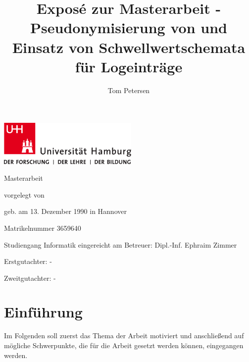 \documentclass[
    fontsize=12pt,
    headings=small,
    parskip=half,           %
    bibliography=totoc,
    numbers=noenddot,       %
    open=any,               %
    ]{scrreprt}
\title{Exposé zur Masterarbeit - Pseudonymisierung von und Einsatz von Schwellwertschemata für Logeinträge}
\author{Tom Petersen}
\begin{document}
\newpage
\thispagestyle{empty}
\begin{titlepage}%
\includegraphics[width=6.8cm]{./img/up-uhh-logo-u-2010-u-farbe-u-rgb.pdf}
\begin{center}\Large
	\vfill
	Masterarbeit
	\vfill
	\makeatletter
	{\Large\textsf{\textbf{\@title}}\par}
	\makeatother
	\vfill
	vorgelegt von
	\par\bigskip
	\makeatletter
	{\@author} \par
	\makeatother
	geb. am 13. Dezember 1990 in Hannover\par
	Matrikelnummer 3659640 \par
	Studiengang Informatik
	\vfill
	\makeatletter
	eingereicht am {\@date}
	\makeatother
	\vfill
	Betreuer: Dipl.-Inf. Ephraim Zimmer\par
	Erstgutachter: - \par
	Zweitgutachter: -
\end{center}
\end{titlepage}%



\chapter{Einführung}

Im Folgenden soll zuerst das Thema der Arbeit motiviert und anschließend auf mögliche Schwerpunkte, die für die Arbeit gesetzt werden können, eingegangen werden.
\end{document}
